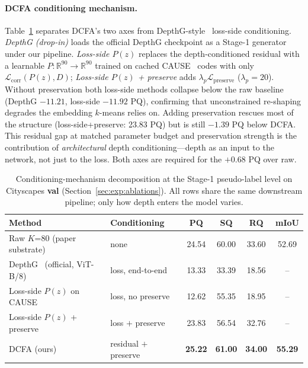 \documentclass{article}
\begin{document}
\paragraph{DCFA conditioning mechanism.}
Table~\ref{tab:conditioning} separates DCFA's two axes from DepthG-style~\cite{sick2024depthg} loss-side conditioning. \emph{DepthG (drop-in)} loads the official DepthG checkpoint as a Stage-1 generator under our pipeline. \emph{Loss-side $P(z)$} replaces the depth-conditioned residual with a learnable $P:\mathbb{R}^{90}\to\mathbb{R}^{90}$ trained on cached CAUSE~\cite{kim2024cause} codes with only $\mathcal{L}_\text{corr}(P(z),D)$; \emph{Loss-side $P(z)$ + preserve} adds $\lambda_p \mathcal{L}_\text{preserve}$ ($\lambda_p{=}20$). Without preservation both loss-side methods collapse below the raw baseline (DepthG $-11.21$, loss-side $-11.92$ PQ), confirming that unconstrained re-shaping degrades the embedding $k$-means relies on. Adding preservation rescues most of the structure (loss-side+preserve: 23.83 PQ) but is still $-1.39$ PQ below DCFA. This residual gap at matched parameter budget and preservation strength is the contribution of \emph{architectural} depth conditioning---depth as an input to the network, not just to the loss. Both axes are required for the $+0.68$ PQ over raw.

\begin{table}[!htbp]
\caption{Conditioning-mechanism decomposition at the Stage-1 pseudo-label level on Cityscapes \textbf{val} (Section~\ref{sec:exp:ablations}). All rows share the same downstream pipeline; only how depth enters the model varies.}
\label{tab:conditioning}
\centering
\scriptsize
\setlength{\tabcolsep}{3pt}
\begin{tabular}{@{}l l c c c c@{}}
\toprule
Method & Conditioning & PQ & SQ & RQ & mIoU \\
\midrule
Raw $K$=80 (paper substrate)        & none                  & 24.54 & 60.00 & 33.60 & 52.69 \\
DepthG~\cite{sick2024depthg} (official, ViT-B/8)          & loss, end-to-end      & 13.33 & 33.39 & 18.56 & -- \\
Loss-side $P(z)$ on CAUSE~\cite{kim2024cause}           & loss, no preserve     & 12.62 & 55.35 & 18.95 & -- \\
Loss-side $P(z)$ + preserve         & loss $+$ preserve     & 23.83 & 56.54 & 32.76 & -- \\
DCFA (ours)                         & residual $+$ preserve & \textbf{25.22} & \textbf{61.00} & \textbf{34.00} & \textbf{55.29} \\
\bottomrule
\end{tabular}
\end{table}
\end{document}
